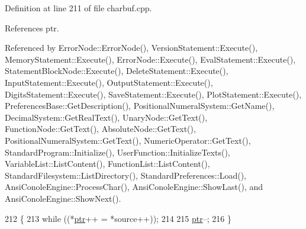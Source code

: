 Definition at line 211 of file charbuf.\+cpp.



References ptr.



Referenced by Error\+Node\+::\+Error\+Node(), Version\+Statement\+::\+Execute(), Memory\+Statement\+::\+Execute(), Error\+Node\+::\+Execute(), Eval\+Statement\+::\+Execute(), Statement\+Block\+Node\+::\+Execute(), Delete\+Statement\+::\+Execute(), Input\+Statement\+::\+Execute(), Output\+Statement\+::\+Execute(), Digits\+Statement\+::\+Execute(), Save\+Statement\+::\+Execute(), Plot\+Statement\+::\+Execute(), Preferences\+Base\+::\+Get\+Description(), Positional\+Numeral\+System\+::\+Get\+Name(), Decimal\+System\+::\+Get\+Real\+Text(), Unary\+Node\+::\+Get\+Text(), Function\+Node\+::\+Get\+Text(), Absolute\+Node\+::\+Get\+Text(), Positional\+Numeral\+System\+::\+Get\+Text(), Numeric\+Operator\+::\+Get\+Text(), Standard\+Program\+::\+Initialize(), User\+Function\+::\+Initialize\+Texts(), Variable\+List\+::\+List\+Content(), Function\+List\+::\+List\+Content(), Standard\+Filesystem\+::\+List\+Directory(), Standard\+Preferences\+::\+Load(), Ansi\+Conole\+Engine\+::\+Process\+Char(), Ansi\+Conole\+Engine\+::\+Show\+Last(), and Ansi\+Conole\+Engine\+::\+Show\+Next().


\begin{DoxyCode}
212 \{
213     \textcolor{keywordflow}{while} ((*\hyperlink{classCharBuffer_a2d313433650506fd6609e6947729dfb0}{ptr}++ = *source++));
214 
215     \hyperlink{classCharBuffer_a2d313433650506fd6609e6947729dfb0}{ptr}--;
216 \}
\end{DoxyCode}


